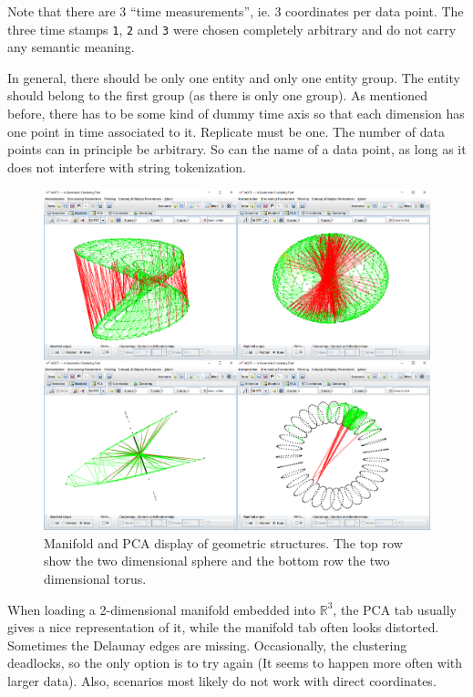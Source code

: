 \documentclass[a4paper]{article}
\begin{document}
Note that there are 3 ``time measurements'', ie. 3 coordinates per data point. The three time stamps \texttt{1}, \texttt{2} and \texttt{3} were chosen completely arbitrary and do not carry any semantic meaning.

In general, there should be only one entity and only one entity group. The entity should belong to the first group (as there is only one group). As mentioned before, there has to be some kind of dummy time axis so that each dimension has one point in time associated to it. Replicate must be one. The number of data points can in principle be arbitrary. So can the name of a data point, as long as it does not interfere with string tokenization.

\begin{figure}[h!]
  \includegraphics[width=\textwidth]{agct/agct_all}
  \caption{Manifold and PCA display of geometric structures. The top row show the two dimensional sphere and the bottom row the two dimensional torus.}
\end{figure}

When loading a 2-dimensional manifold embedded into $\mathbb{R}^3$, the PCA tab usually gives a nice representation of it, while the manifold tab often looks distorted. Sometimes the Delaunay edges are missing. Occasionally, the clustering deadlocks, so the only option is to try again (It seems to happen more often with larger data). Also, scenarios most likely do not work with direct coordinates.
\end{document}
